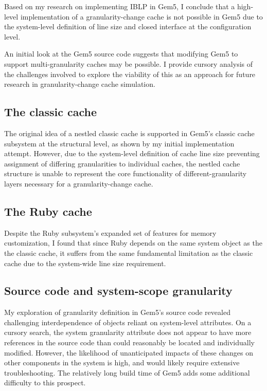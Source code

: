 \documentclass[12pt,twoside]{reedthesis}
\begin{document}
	Based on my research on implementing IBLP in Gem5, I conclude that a high-level implementation of a granularity-change cache is not possible in Gem5 due to the system-level definition of line size and closed interface at the configuration level.
	
	An initial look at the Gem5 source code suggests that modifying Gem5 to support multi-granularity caches may be possible. I provide cursory analysis of the challenges involved to explore the viability of this as an approach for future research in granularity-change cache simulation.

	\subsection*{The classic cache}

	The original idea of a nestled classic cache is supported in Gem5's classic cache subsystem at the structural level, as shown by my initial implementation attempt. However, due to the system-level definition of cache line size preventing assignment of differing granularities to individual caches, the nestled cache structure is unable to represent the core functionality of different-granularity layers necessary for a granularity-change cache.

	\subsection*{The Ruby cache}

	Despite the Ruby subsystem's expanded set of features for memory customization, I found that since Ruby depends on the same system object as the the classic cache, it suffers from the same fundamental limitation as the classic cache due to the system-wide line size requirement.

	\subsection*{Source code and system-scope granularity}

	My exploration of granularity definition in Gem5's source code revealed challenging interdependence of objects reliant on system-level attributes. On a cursory search, the system granularity attribute does not appear to have more references in the source code than could reasonably be located and individually modified. However, the likelihood of unanticipated impacts of these changes on other components in the system is high, and would likely require extensive troubleshooting. The relatively long build time of Gem5 adds some additional difficulty to this prospect.
\end{document}
